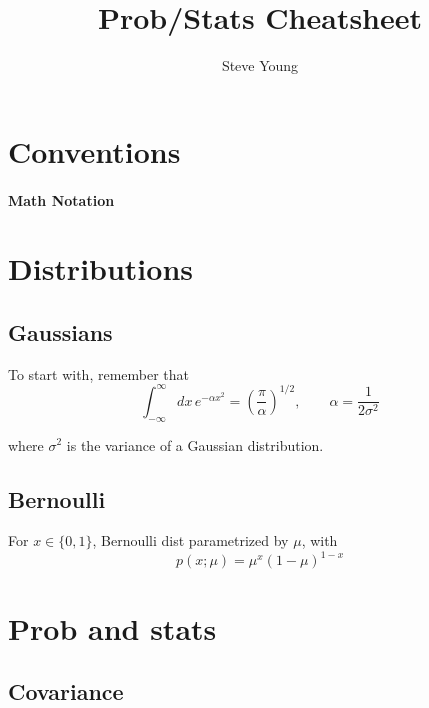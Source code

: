 \documentclass[11pt]{article}
\title{Prob/Stats Cheatsheet}
\author{Steve Young}
\begin{document}
\maketitle

\section{Conventions}
\paragraph{Math Notation}



\section{Distributions}
\subsection{Gaussians}
To start with, remember that
\begin{equation}
  \int_{-\infty}^{\infty} dx \, e^{-\alpha x^2} =
  \left(\frac{\pi}{\alpha}\right)^{1/2}, \qquad \alpha = \frac{1}{2 \sigma^2}
\end{equation}

\noindent where $\sigma^2$ is the variance of a Gaussian distribution.

\subsection{Bernoulli}
For $x \in \{0, 1\}$, Bernoulli dist parametrized by $\mu$, with
\begin{equation}
  p(x; \mu) = \mu^x (1-\mu)^{1-x}
\end{equation}


\section{Prob and stats}
\subsection{Covariance}
\end{document}

